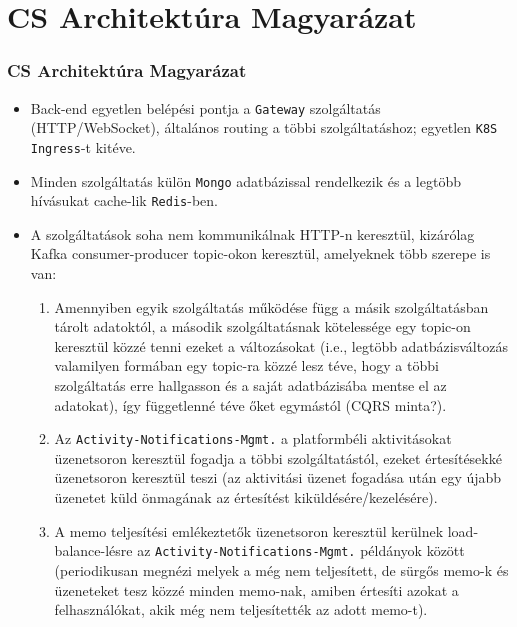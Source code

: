 \section{CS Architektúra Magyarázat}

\begin{frame}
    \frametitle{CS Architektúra Magyarázat}

    \begin{itemize}
        \item Back-end egyetlen belépési pontja a \texttt{Gateway} szolgáltatás (HTTP/WebSocket), általános routing a többi szolgáltatáshoz; egyetlen \texttt{K8S Ingress}-t kitéve.
        \item Minden szolgáltatás külön \texttt{Mongo} adatbázissal rendelkezik és a legtöbb hívásukat cache-lik \texttt{Redis}-ben.
        \item A szolgáltatások soha nem kommunikálnak HTTP-n keresztül, kizárólag Kafka consumer-producer topic-okon keresztül, amelyeknek több szerepe is van:
              \begin{enumerate}
                  \item Amennyiben egyik szolgáltatás működése függ a másik szolgáltatásban tárolt adatoktól, a második szolgáltatásnak kötelessége egy topic-on keresztül közzé tenni ezeket a változásokat (i.e., legtöbb adatbázisváltozás valamilyen formában egy topic-ra közzé lesz téve, hogy a többi szolgáltatás erre hallgasson és a saját adatbázisába mentse el az adatokat), így függetlenné téve őket egymástól (CQRS minta?).
                  \item Az \texttt{Activity-Notifications-Mgmt.} a platformbéli aktivitásokat üzenetsoron keresztül fogadja a többi szolgáltatástól, ezeket értesítésekké üzenetsoron keresztül teszi (az aktivitási üzenet fogadása után egy újabb üzenetet küld önmagának az értesítést kiküldésére/kezelésére).
                  \item A memo teljesítési emlékeztetők üzenetsoron keresztül kerülnek load-balance-lésre az \texttt{Activity-Notifications-Mgmt.} példányok között (periodikusan megnézi melyek a még nem teljesített, de sürgős memo-k és üzeneteket tesz közzé minden memo-nak, amiben értesíti azokat a felhasználókat, akik még nem teljesítették az adott memo-t).
              \end{enumerate}
    \end{itemize}
\end{frame}


